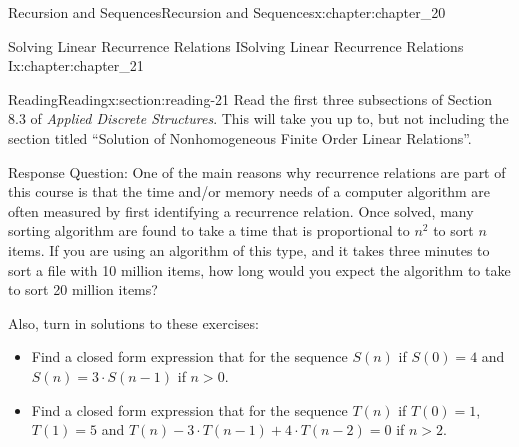 \documentclass[oneside,10pt,]{book}
\numberwithin{equation}{section}
\newenvironment{codedisplay}
{\VerbatimEnvironment\begin{center}\begin{lrbox}{\codedisplaybox}\begin{BVerbatim}}
{\end{BVerbatim}\end{lrbox}\usebox{\codedisplaybox}\end{center}}
\newcommand{\gt}{>}
\begin{document}
\begin{chapterptx}{Recursion and Sequences}{}{Recursion and Sequences}{}{}{x:chapter:chapter_20}
\end{chapterptx}
%
%
\typeout{************************************************}
\typeout{************************************************}
%
\begin{chapterptx}{Solving Linear Recurrence Relations I}{}{Solving Linear Recurrence Relations I}{}{}{x:chapter:chapter_21}
%
%
%
\typeout{************************************************}
\typeout{************************************************}
%
\begin{sectionptx}{Reading}{}{Reading}{}{}{x:section:reading-21}
Read the first three subsections of Section 8.3 of \emph{Applied Discrete Structures}.  This will take you up to, but not including the section titled ``Solution of Nonhomogeneous Finite Order Linear Relations''.%
\par
Response Question: One of the main reasons why recurrence relations are part of this course is that the time and\slash{}or memory needs of a computer algorithm are often measured by first identifying a recurrence relation.  Once solved, many sorting algorithm are found to take a time that is proportional to \(n^2\) to sort \(n\) items.  If you are using an algorithm of this type, and it takes three minutes to sort a file with 10 million items, how long would you expect the algorithm to take to sort 20 million items?%
\par
Also, turn in solutions to these exercises:%
\begin{itemize}[label=\textbullet]
\item{}Find a closed form expression that for the sequence \(S(n)\) if  \(S(0)=4\) and \(S(n)=3 \cdot S(n-1)\) if \(n \gt 0\).%
\item{}Find a closed form expression that for the sequence \(T(n)\) if  \(T(0)=1\), \(T(1)= 5\) and \(T(n)- 3\cdot T(n-1) + 4\cdot T(n-2)=0\) if \(n \gt 2\).%

\end{itemize}
\end{sectionptx}
\end{chapterptx}
\end{document}
